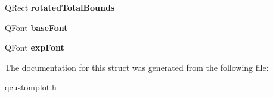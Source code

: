 \begin{DoxyCompactItemize}
\item 
\mbox{\label{structQCPAxisPainterPrivate_1_1TickLabelData_aa4d38c5ea47c9184a78ee33ae7f1012e}} 
Q\+Rect {\bfseries rotated\+Total\+Bounds}
\item 
\mbox{\label{structQCPAxisPainterPrivate_1_1TickLabelData_a0d4958a706debaa8d19a9b65fc090d56}} 
Q\+Font {\bfseries base\+Font}
\item 
\mbox{\label{structQCPAxisPainterPrivate_1_1TickLabelData_adc10767ebcb719d6927c012a38b9d933}} 
Q\+Font {\bfseries exp\+Font}
\end{DoxyCompactItemize}


The documentation for this struct was generated from the following file\+:\begin{DoxyCompactItemize}
\item 
qcustomplot.\+h\end{DoxyCompactItemize}
